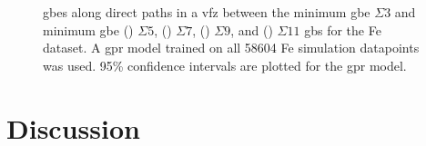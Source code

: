 \documentclass[final,twocolumn,12pt]{elsarticle}
\begin{document}
\begin{figure}[!htb]
\begin{subfigure}[b]{0.48\textwidth}
			\caption{}
			\label{fig:tunnel-3-11-kim}
		\end{subfigure}
		\caption{\Glspl{gbe} along direct paths in a \gls{vfz} between the minimum \gls{gbe} $\Sigma3$  and minimum \gls{gbe} () $\Sigma5$, () $\Sigma7$, () $\Sigma9$, and () $\Sigma11$ \glspl{gb} for the Fe \citet{kimPhasefieldModeling3D2014} dataset. A \gls{gpr} model trained on all \num{58604} Fe \citet{kimPhasefieldModeling3D2014} simulation datapoints was used. 95\% confidence intervals are plotted for the \gls{gpr} model. }
		\label{fig:sigma-tunnels-kim}
	\end{figure}
%	
%	
		
	
	\section{Discussion} \label{sec:discuss}
	
\end{document}
